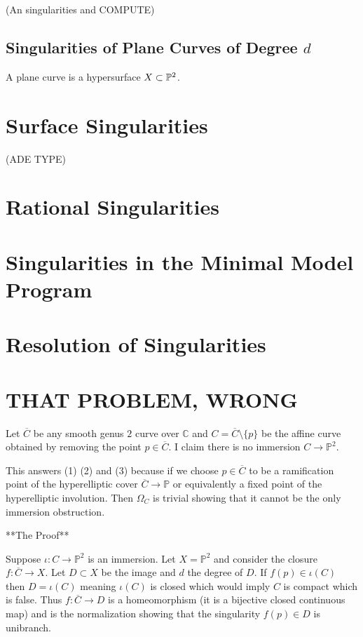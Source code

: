 \documentclass[12pt]{article}
\begin{document}
(An singularities and COMPUTE)

\subsection{Singularities of Plane Curves of Degree $d$}

\begin{defn}
A plane curve is a hypersurface $X \subset \P^2$. 
\end{defn}

\section{Surface Singularities}

(ADE TYPE)

\section{Rational Singularities}

\section{Singularities in the Minimal Model Program}

\section{Resolution of Singularities}

\section{THAT PROBLEM, WRONG}

Let $\overline{C}$ be any smooth genus $2$ curve over $\mathbb{C}$ and $C = \overline{C} \setminus \{ p \}$ be the affine curve obtained by removing the point $p \in \overline{C}$. I claim there is no immersion $C \to \mathbb{P}^2$. 

This answers (1) (2) and (3) because if we choose $p \in \overline{C}$ to be a ramification point of the hyperelliptic cover $\overline{C} \to \mathbb{P}$ or equivalently a fixed point of the hyperelliptic involution. Then $\Omega_C$ is trivial showing that it cannot be the only immersion obstruction. 

**The Proof**

Suppose $\iota : C \to \mathbb{P}^2$ is an immersion. Let $X = \mathbb{P}^2$ and consider the closure $f : \overline{C} \to X$. Let $D \subset X$ be the image and $d$ the degree of $D$. If $f(p) \in \iota(C)$ then $D = \iota(C)$ meaning $\iota(C)$ is closed which would imply $C$ is compact which is false. Thus $f : \overline{C} \to D$ is a homeomorphism (it is a bijective closed continuous map) and is the normalization showing that the singularity $f(p) \in D$ is unibranch. 
\end{document}

